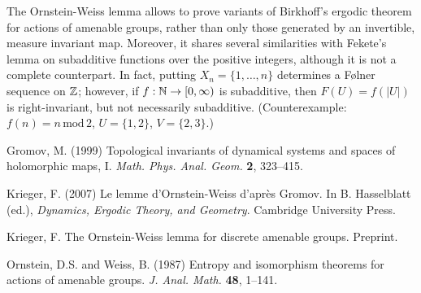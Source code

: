 \documentclass[12pt]{article}
\begin{document}
The Ornstein-Weiss lemma allows to prove variants of Birkhoff's ergodic theorem
for actions of amenable groups,
rather than only those generated by an invertible, measure invariant map.
Moreover, it shares several similarities
with Fekete's lemma on subadditive functions over the positive integers,
although it is not a complete counterpart.
In fact, putting
\begin{math}
X_n = \{1,\ldots,n\}
\end{math}
determines a F{\o}lner sequence on $\mathbb{Z}$;
however, if $f : \mathbb{N} \to [0,\infty)$ is subadditive,
then $F(U) = f(|U|)$ is right-invariant, but not necessarily subadditive.
(Counterexample: $f(n) = n \,\mathrm{mod}\, 2$, $U = \{1,2\}$, $V = \{2,3\}$.)

\begin{thebibliography}{99}

Gromov, M. (1999)
Topological invariants of dynamical systems and spaces of holomorphic maps, I.
\textit{Math. Phys. Anal. Geom.} \textbf{2}, 323--415.

Krieger, F. (2007)
Le lemme d'Ornstein-Weiss d'apr\`es Gromov.
In B. Hasselblatt (ed.), \textit{Dynamics, Ergodic Theory, and Geometry}.
Cambridge University Press.

Krieger, F.
The Ornstein-Weiss lemma for discrete amenable groups.
Preprint.


Ornstein, D.S. and Weiss, B. (1987)
Entropy and isomorphism theorems for actions of amenable groups.
\textit{J. Anal. Math.} \textbf{48}, 1--141.

\end{thebibliography}

\end{document}
